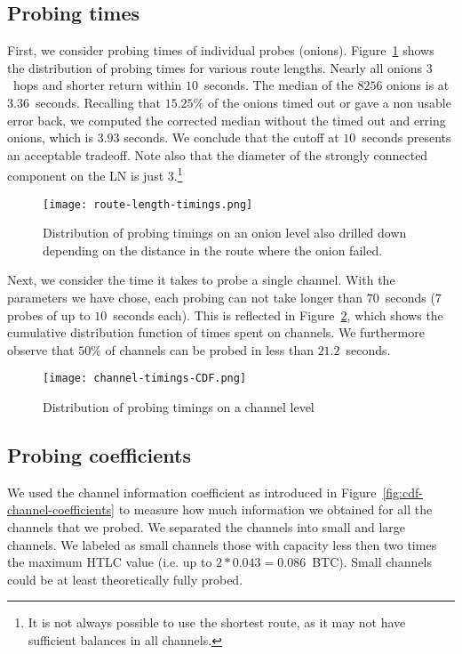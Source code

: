 \subsection{Probing times}

First, we consider probing times of individual probes (onions).
Figure~\ref{fig:route-length-timings} shows the distribution of probing times for various route lengths.
Nearly all onions $3$~hops and shorter return within $10$~seconds.
The median of the $8256$ onions is at $3.36$~seconds.
Recalling that $15.25\%$ of the onions timed out or gave a non usable error back, we computed the corrected median without the timed out and erring onions, which is $3.93$ seconds. 
We conclude that the cutoff at $10$~seconds presents an acceptable tradeoff.
Note also that the diameter of the strongly connected component on the LN is just $3$.\footnote{It is not always possible to use the shortest route, as it may not have sufficient balances in all channels.}

\begin{figure}[]
	\centering
	\texttt{[image: route-length-timings.png]}
	\caption{Distribution of probing timings on an onion level also drilled down depending on the distance in the route where the onion failed.}
	\label{fig:route-length-timings}
\end{figure}


Next, we consider the time it takes to probe a single channel.
With the parameters we have chose, each probing can not take longer than $70$~seconds ($7$ probes of up to $10$~seconds each).
This is reflected in Figure~\ref{fig:channel-timings-CDF}, which shows the cumulative distribution function of times spent on channels.
We furthermore observe that $50\%$ of channels can be probed in less than $21.2$~seconds.

\begin{figure}[]
	\centering
	\texttt{[image: channel-timings-CDF.png]}
	\caption{Distribution of probing timings on a channel level}
	\label{fig:channel-timings-CDF}
\end{figure}




\subsection{Probing coefficients}

We used the channel information coefficient as introduced in Figure~\ref{fig:cdf-channel-coefficients} to measure how much information we obtained for all the channels that we probed.
We separated the channels into small and large channels.
We labeled as small channels those with capacity less then two times the maximum HTLC value (i.e. up to $2*0.043=0.086$~BTC). Small channels could be at least theoretically fully probed.


